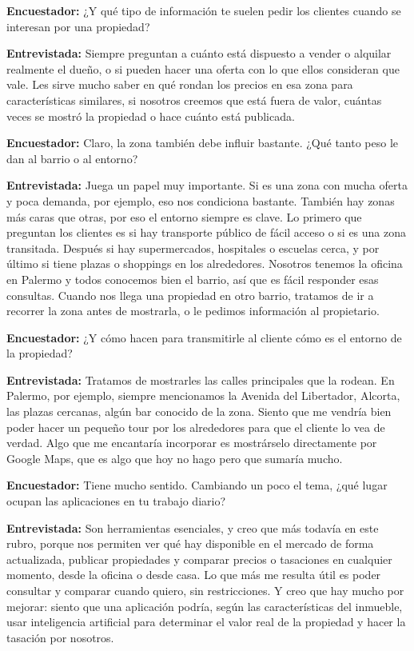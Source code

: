 \textbf{Encuestador:} ¿Y qué tipo de información te suelen pedir los clientes cuando se interesan por una propiedad?

\textbf{Entrevistada:} Siempre preguntan a cuánto está dispuesto a vender o alquilar realmente el dueño, o si pueden hacer una oferta con lo que ellos consideran que vale. Les sirve mucho saber en qué rondan los precios en esa zona para características similares, si nosotros creemos que está fuera de valor, cuántas veces se mostró la propiedad o hace cuánto está publicada.

\textbf{Encuestador:} Claro, la zona también debe influir bastante. ¿Qué tanto peso le dan al barrio o al entorno?

\textbf{Entrevistada:} Juega un papel muy importante. Si es una zona con mucha oferta y poca demanda, por ejemplo, eso nos condiciona bastante. También hay zonas más caras que otras, por eso el entorno siempre es clave. Lo primero que preguntan los clientes es si hay transporte público de fácil acceso o si es una zona transitada. Después si hay supermercados, hospitales o escuelas cerca, y por último si tiene plazas o shoppings en los alrededores. Nosotros tenemos la oficina en Palermo y todos conocemos bien el barrio, así que es fácil responder esas consultas. Cuando nos llega una propiedad en otro barrio, tratamos de ir a recorrer la zona antes de mostrarla, o le pedimos información al propietario.

\textbf{Encuestador:} ¿Y cómo hacen para transmitirle al cliente cómo es el entorno de la propiedad?

\textbf{Entrevistada:} Tratamos de mostrarles las calles principales que la rodean. En Palermo, por ejemplo, siempre mencionamos la Avenida del Libertador, Alcorta, las plazas cercanas, algún bar conocido de la zona. Siento que me vendría bien poder hacer un pequeño tour por los alrededores para que el cliente lo vea de verdad. Algo que me encantaría incorporar es mostrárselo directamente por Google Maps, que es algo que hoy no hago pero que sumaría mucho.

\textbf{Encuestador:} Tiene mucho sentido. Cambiando un poco el tema, ¿qué lugar ocupan las aplicaciones en tu trabajo diario?

\textbf{Entrevistada:} Son herramientas esenciales, y creo que más todavía en este rubro, porque nos permiten ver qué hay disponible en el mercado de forma actualizada, publicar propiedades y comparar precios o tasaciones en cualquier momento, desde la oficina o desde casa. Lo que más me resulta útil es poder consultar y comparar cuando quiero, sin restricciones. Y creo que hay mucho por mejorar: siento que una aplicación podría, según las características del inmueble, usar inteligencia artificial para determinar el valor real de la propiedad y hacer la tasación por nosotros.

